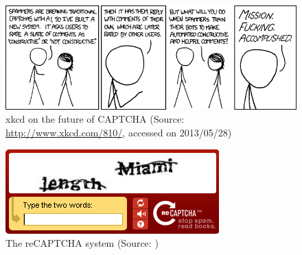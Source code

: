 \documentclass[pdftex,a4paper,12pt,twoside]{report}
\theoremstyle{plain} \newtheorem{theorem}{Theorem} \newtheorem{proposition}{Proposition} \newtheorem{lemma}{Lemma} \newtheorem*{corollary}{Corollary}
\theoremstyle{definition} \newtheorem{definition}{Definition} \newtheorem{conjecture}{Conjecture} \newtheorem*{example}{Example} \newtheorem{algorithm}{Algorithm}
\theoremstyle{remark} \newtheorem*{remark}{Remark} \newtheorem*{note}{Note} \newtheorem{case}{Case}
\begin{document}
\listoffigures
\begin{figure}
	\centering
	\includegraphics[width=13.75cm]{./img/xkcd-captcha-evolution.png}
	\caption{xkcd on the future of CAPTCHA (Source: \url{http://www.xkcd.com/810/}, accessed on 2013/05/28)}
	\label{fig:xkcdCAPTCHA}
\end{figure}
\begin{figure}
	\centering
	\includegraphics[width=\textwidth]{./img/reCAPTCHA.png}
	\caption{The reCAPTCHA system (Source: \citep{UNDP2013})}
	\label{fig:reCAPTCHA}
\end{figure}
\end{document}
